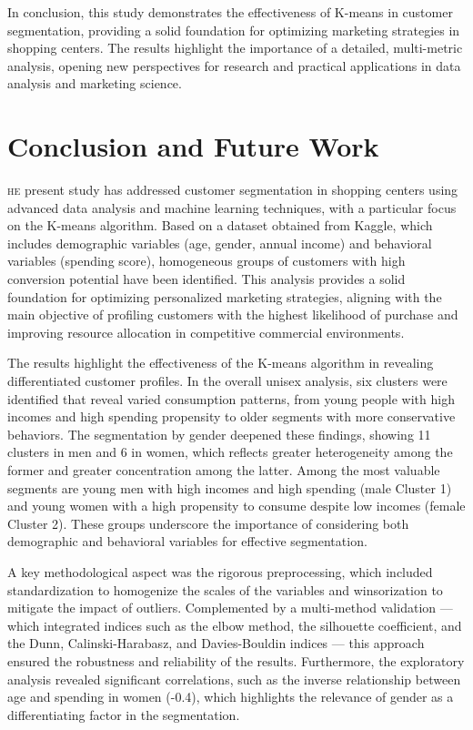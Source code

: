 \documentclass[10pt]{article}
\newcommand*\initfamily{\usefont{U}{GoudyIn}{xl}{n}}
\begin{document}
In conclusion, this study demonstrates the effectiveness of K-means in customer segmentation, providing a solid foundation for optimizing marketing strategies in shopping centers. The results highlight the importance of a detailed, multi-metric analysis, opening new perspectives for research and practical applications in data analysis and marketing science.


\section{Conclusion and Future Work}
\lettrine[lines=3, loversize=0.01, lhang=0.01]{\scalebox{0.9}{\initfamily T}}{he} present study has addressed customer segmentation in shopping centers using advanced data analysis and machine learning techniques, with a particular focus on the K-means algorithm. Based on a dataset obtained from Kaggle, which includes demographic variables (age, gender, annual income) and behavioral variables (spending score), homogeneous groups of customers with high conversion potential have been identified. This analysis provides a solid foundation for optimizing personalized marketing strategies, aligning with the main objective of profiling customers with the highest likelihood of purchase and improving resource allocation in competitive commercial environments.

The results highlight the effectiveness of the K-means algorithm in revealing differentiated customer profiles. In the overall unisex analysis, six clusters were identified that reveal varied consumption patterns, from young people with high incomes and high spending propensity to older segments with more conservative behaviors. The segmentation by gender deepened these findings, showing 11 clusters in men and 6 in women, which reflects greater heterogeneity among the former and greater concentration among the latter. Among the most valuable segments are young men with high incomes and high spending (male Cluster 1) and young women with a high propensity to consume despite low incomes (female Cluster 2). These groups underscore the importance of considering both demographic and behavioral variables for effective segmentation.

A key methodological aspect was the rigorous preprocessing, which included standardization to homogenize the scales of the variables and winsorization to mitigate the impact of outliers. Complemented by a multi-method validation --- which integrated indices such as the elbow method, the silhouette coefficient, and the Dunn, Calinski-Harabasz, and Davies-Bouldin indices --- this approach ensured the robustness and reliability of the results. Furthermore, the exploratory analysis revealed significant correlations, such as the inverse relationship between age and spending in women (-0.4), which highlights the relevance of gender as a differentiating factor in the segmentation.
\end{document}
